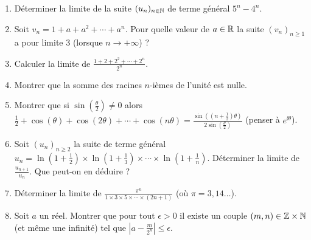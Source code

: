 \begin{frame}
 \begin{miniexercice}
 
 \begin{enumerate}
  \item Déterminer la limite de la suite $(u_n)_{n\in \mathbb{N}}$ de terme général $5^n-4^n$.
  
  \item Soit $v_n=1+a+a^2+\cdots + a^n$. Pour quelle valeur de $a \in \mathbb{R}$ la suite 
  $(v_n)_{n\ge 1}$ a pour limite $3$ (lorsque $n \to + \infty$) ?
     
  \item Calculer la limite de $\frac{1+2+2^2+\cdots + 2^n}{2^n}$.
  
  \item Montrer que la somme des racines $n$-ièmes de l'unité est nulle.
  
  \item Montrer que si $\sin(\frac \theta 2)\neq 0$ alors  
  $\frac{1}{2}+\cos(\theta )+\cos(2\theta )+\cdots+\cos(n\theta )
  =\frac{\sin\left( (n+ \frac{1}{2})\theta \right)}{2\sin(\frac{\theta }{2})}$ 
  (penser à $e^{\ii\theta}$).

  \item Soit $(u_n)_{n\geq 2}$ la suite de terme général 
  $u_n= \ln(1+\frac12)\times\ln(1+\frac 13)\times\cdots\times\ln(1+\frac1n)$.
Déterminer la limite de $\frac{u_{n+1}}{u_n}$. Que peut-on en déduire ? 
  \item Déterminer la limite de $\frac{\pi^n}{1\times 3 \times 5 \times \cdots \times (2n+1)}$ 
  (où $\pi = 3,14\ldots$).
  
   \item Soit $a$ un réel. Montrer que pour tout $\epsilon>0$ il existe un couple 
   $(m,n)\in \mathbb{Z}\times \mathbb{N}$ (et même une infinité) 
tel que $\left|a-\frac{m}{2^n}\right|\leq \epsilon$.
\end{enumerate}

 \end{miniexercice}
 \end{frame}




